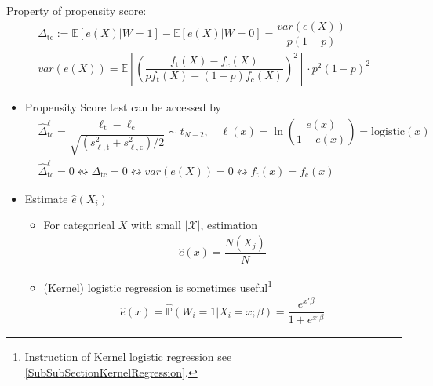 Property of propensity score:
\begin{align}
    \Delta _\mathrm{tc}:= \mathbb{E}\left[ e(X)|W=1 \right] - \mathbb{E}\left[ e(X) |W=0\right]=\dfrac{var(e(X))}{p(1-p)}\\
    var(e(X))=\mathbb{E}\left[ \left(\dfrac{f_\mathrm{t}(X)-f_\mathrm{c}(X)  }{pf_\mathrm{t}(X)+(1-p)f_\mathrm{c}(X)}\right)^2 \right]\cdot p^2(1-p)^2   
\end{align}
\begin{itemize}[topsep=2pt,itemsep=0pt]
    \item Propensity Score test can be accessed by
\begin{align}
    &\hat{\Delta }_\mathrm{tc}^\ell = \dfrac{\bar{\ell}_\mathrm{t}-\bar{\ell}_\mathrm{c}  }{\sqrt{(s^2_{\ell,\mathrm{t} }+s^2_{\ell,\mathrm{c} } )/2}}\sim t_{N-2},\quad \ell(x)=\ln\left(\dfrac{e(x)}{1-e(x)}\right)=\mathrm{logistic}(x) \\
    &\hat{\Delta }_\mathrm{tc}^\ell =0\leftrightsquigarrow \Delta _\mathrm{tc}=0\leftrightsquigarrow var(e(X))=0\leftrightsquigarrow f_\mathrm{t}(x)=f_\mathrm{c}(x)  
\end{align}
    \item Estimate $ \hat{e}(X_i) $
    \begin{itemize}[topsep=2pt,itemsep=0pt]
        \item For categorical $ X $ with small $ |\mathcal{X}| $, estimation
        \begin{align}
            \hat{e}(x)=\dfrac{N(X_j)}{N} 
        \end{align}
        \item (Kernel) logistic regression is sometimes useful\footnote{Instruction of Kernel logistic regression see \autoref{SubSubSectionKernelRegression}.}
        \begin{align}
             \hat{e}(x)=\hat{\mathbb{P}}\left( W_i=1|X_i=x;\beta  \right)=\dfrac{e^{x'\beta }}{1+e^{x'\beta }} 
        \end{align}
    \end{itemize}
    
\end{itemize}

    







